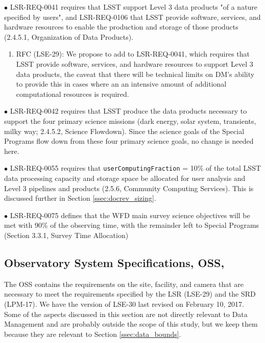 $\bullet$ LSR-REQ-0041 requires that LSST support Level 3 data products "of a nature specified by users", and LSR-REQ-0106 that LSST provide software, services, and hardware resources to enable the production and storage of those products (2.4.5.1, Organization of Data Products).
\begin{enumerate}[resume,topsep=-10pt,after=\vspace{10pt},label= \textbf{Action \Roman*}] \item \label{LSR-4} RFC (LSE-29): We propose to add to LSR-REQ-0041, which requires that LSST provide software, services, and hardware resources to support Level 3 data products, the caveat that there will be technical limits on DM's ability to provide this in cases where an an intensive amount of additional computational resources is required. \end{enumerate}

$\bullet$ LSR-REQ-0042 requires that LSST produce the data products necessary to support the four primary science missions (dark energy, solar system, transients, milky way; 2.4.5.2, Science Flowdown). Since the science goals of the Special Programs flow down from these four primary science goals, no change is needed here.

$\bullet$ LSR-REQ-0055 requires that \texttt{userComputingFraction} = 10\% of the total LSST data processing capacity and storage space be allocated for user analysis and Level 3 pipelines and products (2.5.6, Community Computing Services). This is discussed further in Section \ref{ssec:docrev_sizing}.

$\bullet$ LSR-REQ-0075 defines that the WFD main survey science objectives will be met with 90\% of the observing time, with the remainder left to Special Programs (Section 3.3.1, Survey Time Allocation)


\subsection{Observatory System Specifications, OSS, }\label{ssec:docrev_oss}

The OSS contains the requirements on the site, facility, and camera that are necessary to meet the requirements specified by the LSR (LSE-29) and the SRD (LPM-17). We have the version of LSE-30 last revised on February 10, 2017. Some of the aspects discussed in this section are not directly relevant to Data Management and are probably outside the scope of this study, but we keep them because they are relevant to Section \ref{ssec:data_bounds}.

